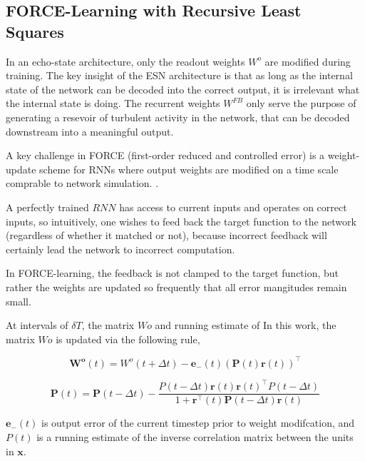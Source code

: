 \documentclass{article} %
\newcommand{\bf}[1]{\mathbf{#1}}
\newcommand{\x}{\bf{x}}
\begin{document}
\subsection{FORCE-Learning with Recursive Least Squares}



In an echo-state architecture, only the readout weights $W^o$ are modified during training. The key insight of the ESN architecture is that as long as the internal state of the network can be decoded into the correct output, it is irrelevant what the internal state is doing. The recurrent weights $W^{FB}$ only serve the purpose of generating a resevoir of turbulent activity in the network, that can be decoded downstream into a meaningful output.

A key challenge in
FORCE (first-order reduced and controlled error) is a weight-update scheme for RNNs where output weights are modified on a time scale comprable to network simulation.  \cite{Sussillo2009544}.

A perfectly trained $RNN$ has access to current inputs and operates on correct inputs, so intuitively, one wishes to feed back the target function to the network (regardless of whether it matched or not), because incorrect feedback will certainly lead the network to incorrect computation.

In FORCE-learning, the feedback is not clamped to the target function, but rather the weights are updated so frequently that all error mangitudes remain small.

At intervals of $\delta T$, the matrix $Wo$ and running estimate of In this work, the matrix $Wo$ is updated via the following rule,

\begin{equation} \label{eq:FORCE1}
\bf{W^o}(t) = W^o{(t+\Delta t)} - \bf{e}_{-}(t)(\bf{P}(t)\bf{r}(t))^\intercal
\end{equation}


\begin{equation}
\bf{P}(t) = \bf{P}(t-\Delta t) - \frac{P(t-\Delta t)\bf{r}(t)\bf{r}(t)^{\intercal}P(t-\Delta t)}{1+\bf{r}^{\intercal}(t)\bf{P}(t-\Delta t)\bf{r}(t)}
\end{equation}

$\bf{e}_{-}(t)$ is output error of the current timestep prior to weight modifcation, and $P(t)$ is a running estimate of the inverse correlation matrix between the units in $\x$.
\end{document}
